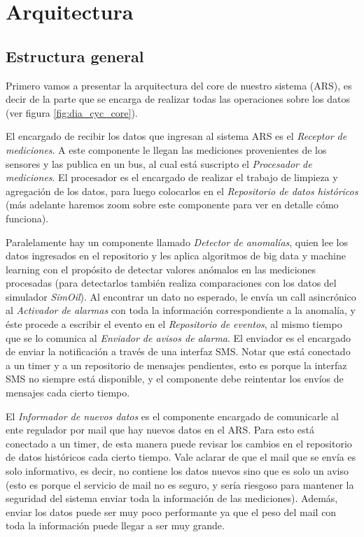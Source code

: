 \section{Arquitectura}

\subsection{Estructura general}

\par Primero vamos a presentar la arquitectura del core de nuestro sistema (ARS), es decir de la parte que se encarga de realizar todas las operaciones sobre los datos (ver figura \ref{fig:dia_cyc_core}). \\

\par El encargado de recibir los datos que ingresan al sistema ARS es el \textit{Receptor de mediciones}. A este componente le llegan las mediciones provenientes de los sensores y las publica en un bus, al cual está suscripto el \textit{Procesador de mediciones}. El procesador es el encargado de realizar el trabajo de limpieza y agregación de los datos, para luego colocarlos en el \textit{Repositorio de datos históricos} (más adelante haremos zoom sobre este componente para ver en detalle cómo funciona). \\

\par Paralelamente hay un componente llamado \textit{Detector de anomalías}, quien lee los datos ingresados en el repositorio y les aplica algoritmos de big data y machine learning con el propósito de detectar valores anómalos en las mediciones procesadas (para detectarlos también realiza comparaciones con los datos del simulador \textit{SimOil}). Al encontrar un dato no esperado, le envía un call asincrónico al \textit{Activador de alarmas} con toda la información correspondiente a la anomalía, y éste procede a escribir el evento en el \textit{Repositorio de eventos}, al mismo tiempo que se lo comunica al \textit{Enviador de avisos de alarma}. El enviador es el encargado de enviar la notificación a través de una interfaz SMS. Notar que está conectado a un timer y a un repositorio de mensajes pendientes, esto es porque la interfaz SMS no siempre está disponible, y el componente debe reintentar los envíos de mensajes cada cierto tiempo. \\

\par El \textit{Informador de nuevos datos} es el componente encargado de comunicarle al ente regulador por mail que hay nuevos datos en el ARS. Para esto está conectado a un timer, de esta manera puede revisar los cambios en el repositorio de datos históricos cada cierto tiempo. Vale aclarar de que el mail que se envía es solo informativo, es decir, no contiene los datos nuevos sino que es solo un aviso (esto es porque el servicio de mail no es seguro, y sería riesgoso para mantener la seguridad del sistema enviar toda la información de las mediciones). Además, enviar los datos puede ser muy poco performante ya que el peso del mail con toda la información puede llegar a ser muy grande. \\

